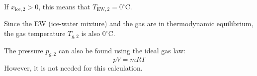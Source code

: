 If \( x_{\text{ice},2} > 0 \), this means that \( T_{\text{EW},2} = 0^\circ\text{C} \).  

Since the EW (ice-water mixture) and the gas are in thermodynamic equilibrium, the gas temperature \( T_{g,2} \) is also \( 0^\circ\text{C} \).  

The pressure \( p_{g,2} \) can also be found using the ideal gas law:  
\[
pV = mRT
\]  
However, it is not needed for this calculation.